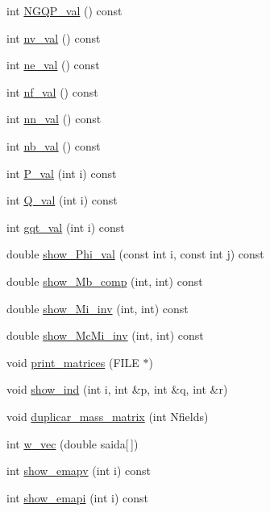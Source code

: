 \begin{DoxyCompactItemize}
int \hyperlink{classStdel_a2f964819235e0a55fd60733518b592f2}{N\+G\+Q\+P\+\_\+val} () const
\item 
int \hyperlink{classStdel_ae2ab461d1bc8d9f6006665fe03684845}{nv\+\_\+val} () const
\item 
int \hyperlink{classStdel_aa45f211663f5e8e47fdea32232ff23ea}{ne\+\_\+val} () const
\item 
int \hyperlink{classStdel_a2eed3ce0b73050e868989be78d918e5c}{nf\+\_\+val} () const
\item 
int \hyperlink{classStdel_a6086dceed8fe3dd410da0d6b84f02377}{nn\+\_\+val} () const
\item 
int \hyperlink{classStdel_a4fb0a049dc27d8e67665a56d1b5a18ba}{nb\+\_\+val} () const
\item 
int \hyperlink{classStdel_a701c7d5595d4f6632333c4202898983b}{P\+\_\+val} (int i) const
\item 
int \hyperlink{classStdel_aeea4659f5bcabbf1acb374180c43a293}{Q\+\_\+val} (int i) const
\item 
int \hyperlink{classStdel_a0775d0c4f7f15ae26bd45fc949e6f6b9}{gqt\+\_\+val} (int i) const
\item 
double \hyperlink{classStdel_a6565c36150823a1f52a2daf05806f7a4}{show\+\_\+\+Phi\+\_\+val} (const int i, const int j) const
\item 
double \hyperlink{classStdel_a4860f0f650640f859c5f75c206ee1f60}{show\+\_\+\+Mb\+\_\+comp} (int, int) const
\item 
double \hyperlink{classStdel_a11bf2897170ada9a9dd8f641a39585e5}{show\+\_\+\+Mi\+\_\+inv} (int, int) const
\item 
double \hyperlink{classStdel_a44d5aa234e02fb41afd5a4e5e45fadc4}{show\+\_\+\+Mc\+Mi\+\_\+inv} (int, int) const
\item 
void \hyperlink{classStdel_a319e6a16011b22e12028a841b7686f03}{print\+\_\+matrices} (F\+I\+LE $\ast$)
\item 
void \hyperlink{classStdel_a20afd536025caf1aad1c4e3f41fcb866}{show\+\_\+ind} (int i, int \&p, int \&q, int \&r)
\item 
void \hyperlink{classStdel_a922b779be1f8f12b7a5535ab529bff64}{duplicar\+\_\+mass\+\_\+matrix} (int Nfields)
\item 
int \hyperlink{classStdel_a395c8d7d7890a9efdea23932fa22b420}{w\+\_\+vec} (double saida\mbox{[}$\,$\mbox{]})
\item 
int \hyperlink{classStdel_ad474ffc52b051ae8317b3fdb583c4c98}{show\+\_\+emapv} (int i) const
\item 
int \hyperlink{classStdel_aca7fb885191a952c013e930521a42213}{show\+\_\+emapi} (int i) const

\end{DoxyCompactItemize}

